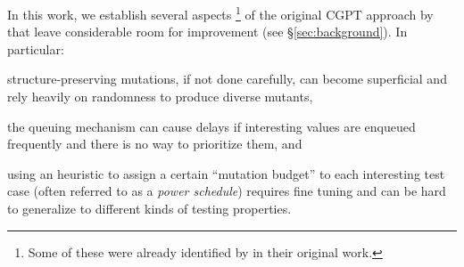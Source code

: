 \documentclass[sigconf, anonymous, review]{acmart}
\newcommand{\fuzzchick}{\textit{FuzzChick}\xspace}
\begin{document}
%
%
%
%
%

In this work, we establish several aspects%
\footnote{Some of these were already identified by
  \citeauthor{lampropoulos2019coverage} in their original work.}
%
of the original CGPT approach by \citeauthor{lampropoulos2019coverage} that
leave considerable room for improvement (see \S \ref{sec:background}).
%
In particular:
%
\begin{inparaenum}
\item structure-preserving mutations, if not done carefully, can become
  superficial and rely heavily on randomness to produce diverse mutants,
\item the queuing mechanism can cause delays if interesting values are enqueued
  frequently and there is no way to prioritize them, and
\item using an heuristic to assign a certain ``mutation budget'' to each
  interesting test case (often referred to as a \emph{power schedule}) requires
  fine tuning and can be hard to generalize to different kinds of testing
  properties.
\end{inparaenum}
%
\end{document}

